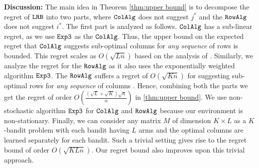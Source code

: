 \textbf{Discussion:} The main idea in Theorem \ref{thm:upper bound} is to decompose the regret of ${\tt LRB}$ into two parts, where ${\tt ColAlg}$ does not suggest $j^*$ and the ${\tt RowAlg}$ does not suggest $i^*$. The first part is analyzed as follows. ${\tt ColAlg}$ has a sub-linear regret, as we use ${\tt Exp3}$ as the ${\tt ColAlg}$. Thus, the upper bound on the expected regret that ${\tt ColAlg}$ suggests sub-optimal columns for \emph{any sequence} of rows is bounded. This regret scales as $O(\sqrt{L n})$ based on the analysis of \citet{auer2002nonstochastic}. Similarly, we analyze the regret for the ${\tt RowAlg}$ as it also uses the exponentially weighted algorithm ${\tt Exp3}$. The ${\tt RowAlg}$ suffers a regret of $O(\sqrt{K n})$ for suggesting sub-optimal rows for \emph{any sequence} of columns . Hence, combining both the parts we get the regret of order $O\left(\frac{\left(\sqrt{L } + \sqrt{K }\right)\sqrt{n}}{\alpha}\right)$ in \cref{thm:upper bound}. We use non-stochastic algorithm ${\tt Exp3}$ for ${\tt ColAlg}$ and ${\tt RowAlg}$ because our environment is non-stationary. Finally, we can consider any matrix $M$ of dimension $K\times L$ as a $K$-bandit problem with each bandit having $L$ arms and the optimal columns are learned separately for each bandit. Such a trivial setting gives rise to the regret bound of order $O(\sqrt{K L n})$. Our regret bound also improves upon this trivial approach.




